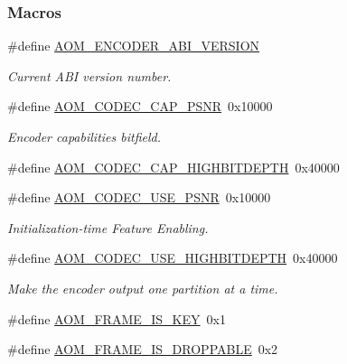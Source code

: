 \subsubsection*{Macros}
\begin{DoxyCompactItemize}
\item 
\mbox{\label{group__encoder_gae4af664f2049d5b7d7b644d9a61d497c}} 
\#define \hyperlink{group__encoder_gae4af664f2049d5b7d7b644d9a61d497c}{A\+O\+M\+\_\+\+E\+N\+C\+O\+D\+E\+R\+\_\+\+A\+B\+I\+\_\+\+V\+E\+R\+S\+I\+ON}
\begin{DoxyCompactList}\small\item\em Current A\+BI version number. \end{DoxyCompactList}\item 
\#define \hyperlink{group__encoder_gaaf72058c11fcf006c41662114997e12c}{A\+O\+M\+\_\+\+C\+O\+D\+E\+C\+\_\+\+C\+A\+P\+\_\+\+P\+S\+NR}~0x10000
\begin{DoxyCompactList}\small\item\em Encoder capabilities bitfield. \end{DoxyCompactList}\item 
\#define \hyperlink{group__encoder_ga608725216f15096fa209d30fef121c1c}{A\+O\+M\+\_\+\+C\+O\+D\+E\+C\+\_\+\+C\+A\+P\+\_\+\+H\+I\+G\+H\+B\+I\+T\+D\+E\+P\+TH}~0x40000
\item 
\#define \hyperlink{group__encoder_gae722c9f9ba9b4ca8dba6bbe7c0692024}{A\+O\+M\+\_\+\+C\+O\+D\+E\+C\+\_\+\+U\+S\+E\+\_\+\+P\+S\+NR}~0x10000
\begin{DoxyCompactList}\small\item\em Initialization-\/time Feature Enabling. \end{DoxyCompactList}\item 
\#define \hyperlink{group__encoder_gae30bbbdef18e9da3631b69c170533e92}{A\+O\+M\+\_\+\+C\+O\+D\+E\+C\+\_\+\+U\+S\+E\+\_\+\+H\+I\+G\+H\+B\+I\+T\+D\+E\+P\+TH}~0x40000
\begin{DoxyCompactList}\small\item\em Make the encoder output one partition at a time. \end{DoxyCompactList}\item 
\#define \hyperlink{group__encoder_gaf4a58f123913a5eef0a3796f0619e5f3}{A\+O\+M\+\_\+\+F\+R\+A\+M\+E\+\_\+\+I\+S\+\_\+\+K\+EY}~0x1
\item 
\mbox{\label{group__encoder_ga5c5a0513ebc6177ce500370cf89ad489}} 
\#define \hyperlink{group__encoder_ga5c5a0513ebc6177ce500370cf89ad489}{A\+O\+M\+\_\+\+F\+R\+A\+M\+E\+\_\+\+I\+S\+\_\+\+D\+R\+O\+P\+P\+A\+B\+LE}~0x2

\end{DoxyCompactItemize}
